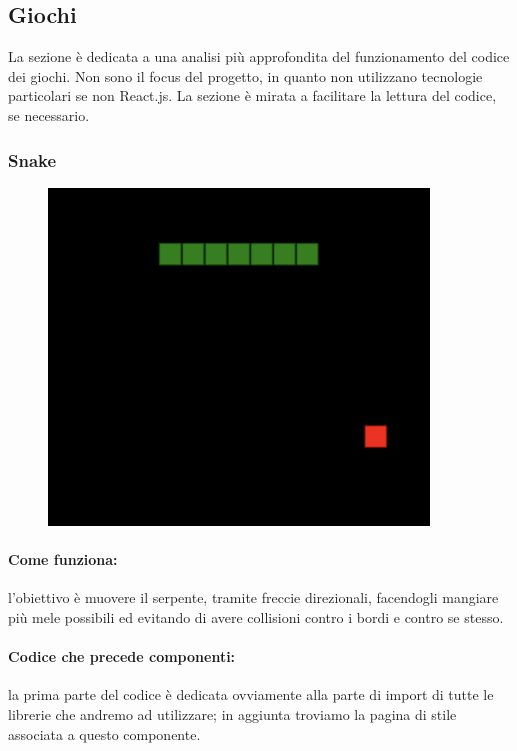 \documentclass{article}
\begin{document}
\subsection{Giochi}
La sezione è dedicata a una analisi più approfondita del funzionamento del codice dei giochi.
Non sono il focus del progetto, in quanto non utilizzano tecnologie particolari se non React.js. La sezione è mirata a facilitare la lettura del codice, se necessario.


\subsubsection{Snake}
\begin{figure}[H]
    \centering
    \includegraphics[width=0.9\textwidth]{../frontend/public/images/snake.png}
\end{figure}

\paragraph{Come funziona:}
l'obiettivo è muovere il serpente, tramite freccie direzionali, facendogli mangiare più mele possibili ed evitando di avere collisioni contro i bordi e contro se stesso.


\paragraph{Codice che precede componenti:} 
la prima parte del codice è dedicata ovviamente alla parte di import di tutte le librerie che andremo ad utilizzare; in aggiunta troviamo la pagina di stile associata a questo componente.
\end{document}
